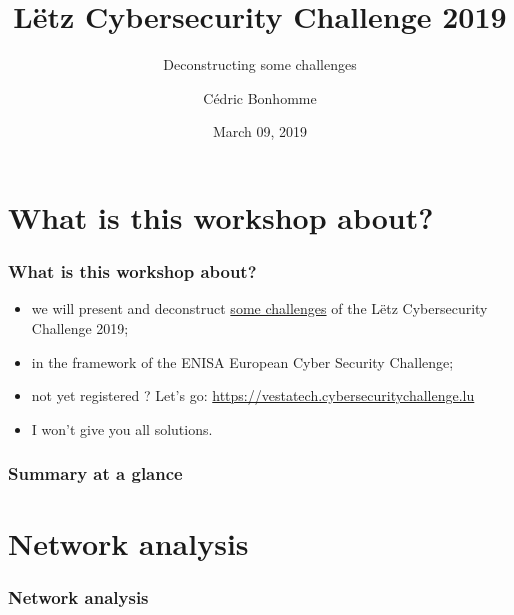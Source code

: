 \documentclass[]{beamer}
\title[Deconstructing some challenges from LCSC 2019]{Lëtz Cybersecurity Challenge 2019}
\subtitle{Deconstructing some challenges}
\author{C\'{e}dric Bonhomme}
\institute[CIRCL]{CIRCL - Security Made In Lëtzebuerg}
\date{March 09, 2019}
\begin{document}
\begin{frame}
    \titlepage
\end{frame}


%
%
\section*{What is this workshop about?}
\begin{frame}
    \frametitle{What is this workshop about?}
    \begin{center}
        \begin{itemize}
            \item we will present and deconstruct \href{https://github.com/cscluxembourg/vestatech}{some challenges} of the Lëtz Cybersecurity Challenge 2019;
            \item in the framework of the ENISA European Cyber Security Challenge;
            \item not yet registered ? Let's go: \href{https://vestatech.cybersecuritychallenge.lu}{https://vestatech.cybersecuritychallenge.lu}
            \item I won't give you all solutions.
        \end{itemize}
    \end{center}
\end{frame}


\setcounter{tocdepth}{1}
\begin{frame}
    \frametitle{Summary at a glance}
    \tableofcontents
\end{frame}
\setcounter{tocdepth}{4}



% 
%
\section{Network analysis}
\begin{frame}
    \frametitle{Network analysis}
    \begin{columns}[t]
        \begin{column}{5cm}
            \tableofcontents[sections={1-3}, currentsection, hideothersubsections]
        \end{column}
        \begin{column}{5cm}
            \tableofcontents[sections={4-5}, currentsection, hideothersubsections]
        \end{column}
    \end{columns}
\end{frame}
\end{document}
